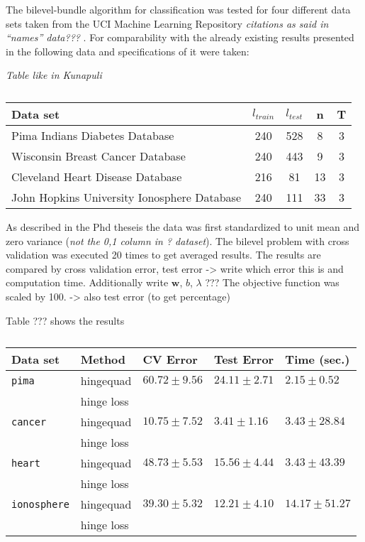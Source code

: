 The bilevel-bundle algorithm for classification was tested for four different data sets taken from the UCI Machine Learning Repository \emph{citations as said in ``names'' data??? }.
For comparability with the already existing results presented in \cite{Kunapuli2008} the following data and specifications of it were taken:

\begin{center}
\emph{Table like in Kunapuli}
\begin{table}[H]%
	\begin{tabular}{lcccc}
		\hline
    Data set & \(l_{train}\) & \(l_{test}\) & n & T \\
		\hline
		Pima Indians Diabetes Database & 240 & 528 & 8 & 3 \\
		Wisconsin Breast Cancer Database & 240 & 443 & 9 & 3 \\
		Cleveland Heart Disease Database & 216 & 81 & 13 & 3 \\
		John Hopkins University Ionosphere Database & 240 & 111 & 33 & 3
	\end{tabular}
	\caption{}
	\label{}
\end{table}
\end{center}

As described in the Phd theseis the data was first standardized to unit mean and zero variance (\emph{not the 0,1 column in ? dataset}). The bilevel problem with cross validation was executed 20 times to get averaged results.
The results are compared by cross validation error, test error -> write which error this is and computation time.
Additionally write \(\bm{w}\), \(b\), \(\lambda\) ???
The objective function was scaled by 100. -> also test error (to get percentage) 

Table ??? shows the results 

\begin{center}
\begin{table}[H]%
	\begin{tabular}{lllll}
		\hline
		Data set & Method & CV Error & Test Error & Time (sec.) \\
		\hline
		\texttt{pima} & hingequad & \(60.72 \pm 9.56\) & \(24.11\pm 2.71\) & \(2.15 \pm 0.52\)\\
		 &              hinge loss & & & \\
		\texttt{cancer} &  hingequad & \(10.75\pm 7.52\) & \(3.41 \pm 1.16\) & \(3.43 \pm 28.84\) \\
		 &              hinge loss & & & \\
		\texttt{heart} &  hingequad & \(48.73 \pm 5.53\) & \(15.56 \pm 4.44\) & \(3.43 \pm 43.39\)\\
		 &              hinge loss & & & \\
		\texttt{ionosphere} &  hingequad & \(39.30 \pm 5.32\) & \(12.21 \pm 4.10\) & \(14.17 \pm 51.27\)\\
		 &              hinge loss & & & \\
	\end{tabular}
	\caption{}
	\label{res_table}
\end{table}
\end{center}

